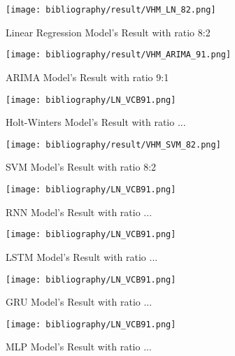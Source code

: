 \documentclass{ieeeojies}
\begin{document}
	\begin{figure}[H]
		\centering
		\begin{minipage}{0.9\linewidth}
			\centering
			\texttt{[image: bibliography/result/VHM\_LN\_82.png]}
			\caption{Linear Regression Model's Result with ratio 8:2}
			\label{fig1.1}
		\end{minipage}
	\end{figure}
	\begin{figure}[H]
		\centering
		\begin{minipage}{0.9\linewidth}
			\centering
			\texttt{[image: bibliography/result/VHM\_ARIMA\_91.png]}
			\caption{ARIMA Model's Result with ratio 9:1}
			\label{fig1.2}
		\end{minipage}
	\end{figure}
	\begin{figure}[H]
		\centering
		\begin{minipage}{0.9\linewidth}
			\centering
			\texttt{[image: bibliography/LN\_VCB91.png]}
			\caption{Holt-Winters Model's Result with ratio ...}
			\label{fig1.3}
		\end{minipage}
	\end{figure}
	\begin{figure}[H]
		\centering
		\begin{minipage}{0.9\linewidth}
			\centering
			\texttt{[image: bibliography/result/VHM\_SVM\_82.png]}
			\caption{SVM Model's Result with ratio 8:2}
			\label{fig1.4}
		\end{minipage}
	\end{figure}
	\begin{figure}[H]
		\centering
		\begin{minipage}{0.9\linewidth}
			\centering
			\texttt{[image: bibliography/LN\_VCB91.png]}
			\caption{RNN Model's Result with ratio ...}
			\label{fig1.5}
		\end{minipage}
	\end{figure}
	\begin{figure}[H]
		\centering
		\begin{minipage}{0.9\linewidth}
			\centering
			\texttt{[image: bibliography/LN\_VCB91.png]}
			\caption{LSTM Model's Result with ratio ...}
			\label{fig1.6}
		\end{minipage}
	\end{figure}
	\begin{figure}[H]
		\centering
		\begin{minipage}{0.9\linewidth}
			\centering
			\texttt{[image: bibliography/LN\_VCB91.png]}
			\caption{GRU Model's Result with ratio ...}
			\label{fig1.7}
		\end{minipage}
	\end{figure}
	\begin{figure}[H]
		\centering
		\begin{minipage}{0.9\linewidth}
			\centering
			\texttt{[image: bibliography/LN\_VCB91.png]}
			\caption{MLP Model's Result with ratio ...}
			\label{fig1.8}
		\end{minipage}
	\end{figure}
	
\end{document}
